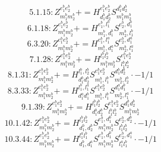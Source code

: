 \documentclass[letterpaper,10pt,fleqn,leqno,onecolumn]{article}
\begin{document}
\begin{equation} \;\;\;\;\;\;  5.1.15: Z^{e_{1}^{b}e_{2}^{b}}_{m_{1}^{b}m_{2}^{b}}+=H^{e_{1}^{b}e_{2}^{b}}_{d_{1}^{b}d_{2}^{b}}S^{d_{1}^{b}d_{2}^{b}}_{m_{1}^{b}m_{2}^{b}} \end{equation}
\begin{equation} \;\;\;\;\;\;  6.1.18: Z^{e_{1}^{b}e_{2}^{b}}_{m_{1}^{b}m_{2}^{b}}+=H^{e_{1}^{b},l_{1}^{b}}_{m_{1}^{b},d_{1}^{b}}S^{e_{2}^{b},d_{1}^{b}}_{m_{2}^{b},l_{1}^{b}} \end{equation}
\begin{equation} \;\;\;\;\;\;  6.3.20: Z^{e_{1}^{b}e_{2}^{b}}_{m_{1}^{b}m_{2}^{b}}+=H^{e_{1}^{b},l_{1}^{a}}_{m_{1}^{b},d_{1}^{a}}S^{e_{2}^{b},d_{1}^{a}}_{m_{2}^{b},l_{1}^{a}} \end{equation}
\begin{equation} \;\;\;\;\;\;  7.1.28: Z^{e_{1}^{b}e_{2}^{b}}_{m_{1}^{b}m_{2}^{b}}+=H^{l_{1}^{b}l_{2}^{b}}_{m_{1}^{b}m_{2}^{b}}S^{e_{1}^{b}e_{2}^{b}}_{l_{1}^{b}l_{2}^{b}} \end{equation}
\begin{equation} \;\;\;\;\;\;  8.1.31: Z^{e_{1}^{b}e_{2}^{b}}_{m_{1}^{b}m_{2}^{b}}+=H^{l_{1}^{b},l_{2}^{b}}_{d_{1}^{b}d_{2}^{b}}S^{e_{1}^{b}e_{2}^{b}}_{m_{1}^{b},l_{1}^{b}}S^{d_{1}^{b}d_{2}^{b}}_{m_{2}^{b},l_{2}^{b}}\cdot -1/1 \end{equation}
\begin{equation} \;\;\;\;\;\;  8.3.33: Z^{e_{1}^{b}e_{2}^{b}}_{m_{1}^{b}m_{2}^{b}}+=H^{l_{1}^{b},l_{1}^{a}}_{d_{1}^{a}d_{1}^{b}}S^{e_{1}^{b}e_{2}^{b}}_{m_{1}^{b},l_{1}^{b}}S^{d_{1}^{a}d_{1}^{b}}_{m_{2}^{b},l_{1}^{a}}\cdot -1/1 \end{equation}
\begin{equation} \;\;\;\;\;\;  9.1.39: Z^{e_{1}^{b}e_{2}^{b}}_{m_{1}^{b}m_{2}^{b}}+=H^{l_{1}^{b}l_{2}^{b}}_{d_{1}^{b}d_{2}^{b}}S^{e_{1}^{b}e_{2}^{b}}_{l_{1}^{b}l_{2}^{b}}S^{d_{1}^{b}d_{2}^{b}}_{m_{1}^{b}m_{2}^{b}} \end{equation}
\begin{equation} \;\;\;\;\;\;  10.1.42: Z^{e_{1}^{b}e_{2}^{b}}_{m_{1}^{b}m_{2}^{b}}+=H^{l_{1}^{b}l_{2}^{b}}_{d_{1}^{b},d_{2}^{b}}S^{e_{1}^{b},d_{1}^{b}}_{m_{1}^{b}m_{2}^{b}}S^{e_{2}^{b},d_{2}^{b}}_{l_{1}^{b}l_{2}^{b}}\cdot -1/1 \end{equation}
\begin{equation} \;\;\;\;\;\;  10.3.44: Z^{e_{1}^{b}e_{2}^{b}}_{m_{1}^{b}m_{2}^{b}}+=H^{l_{1}^{a}l_{1}^{b}}_{d_{1}^{b},d_{1}^{a}}S^{e_{1}^{b},d_{1}^{b}}_{m_{1}^{b}m_{2}^{b}}S^{e_{2}^{b},d_{1}^{a}}_{l_{1}^{a}l_{1}^{b}}\cdot -1/1 \end{equation}
\end{document}
